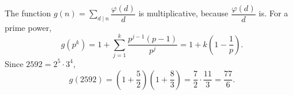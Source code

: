 The function $g(n)=\displaystyle\sum_{d\mid n}\dfrac{\varphi(d)}{d}$ is multiplicative, because $\dfrac{\varphi(d)}{d}$ is. For a prime power,
\[g(p^k)=1+\sum_{j=1}^{k}\dfrac{p^{j-1}(p-1)}{p^j}=1+k\left(1-\dfrac1p\right).\]
Since $2592=2^5\cdot3^4$,
\[g(2592)=\left(1+\dfrac52\right)\left(1+\dfrac{8}{3}\right)=\dfrac72\cdot\dfrac{11}{3}=\boxed{\dfrac{77}{6}}.\]
